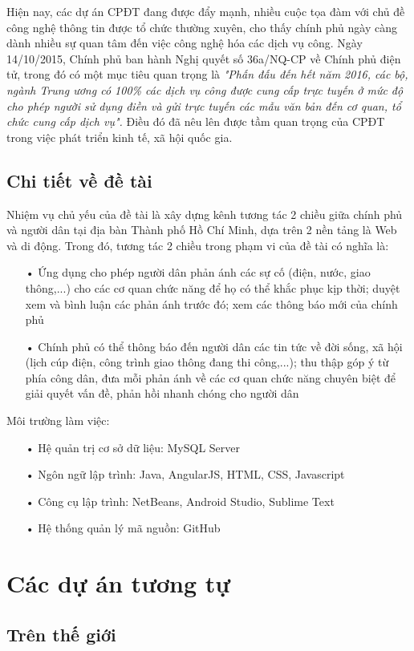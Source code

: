 \documentclass[a4paper]{article}
\begin{document}
Hiện nay, các dự án CPĐT đang được đẩy mạnh, nhiều cuộc tọa đàm với chủ đề công nghệ thông tin được tổ chức thường xuyên, cho thấy chính phủ ngày càng dành nhiều sự quan tâm đến việc công nghệ hóa các dịch vụ công. Ngày 14/10/2015, Chính phủ ban hành Nghị quyết số 36a/NQ-CP về Chính phủ điện tử, trong đó có một mục tiêu quan trọng là \textit{"Phấn đấu đến hết năm 2016, các bộ, ngành Trung ương có 100\% các dịch vụ công được cung cấp trực tuyến ở mức độ cho phép người sử dụng điền và gửi trực tuyến các mẫu văn bản đến cơ quan, tổ chức cung cấp dịch vụ".} Điều đó đã nêu lên được tầm quan trọng của CPĐT trong việc phát triển kinh tế, xã hội quốc gia. 
\subsection{Chi tiết về đề tài}
Nhiệm vụ chủ yếu của đề tài là xây dựng kênh tương tác 2 chiều giữa chính phủ và người dân tại địa bàn Thành phố Hồ Chí Minh, dựa trên 2 nền tảng là Web và di động. Trong đó, tương tác 2 chiều trong phạm vi của đề tài có nghĩa là:
\begin{itemize}
     \item[•]Ứng dụng cho phép người dân phản ánh các sự cố (điện, nước, giao thông,...) cho các cơ quan chức năng để họ có thể khắc phục kịp thời; duyệt xem và bình luận các phản ánh trước đó; xem các thông báo mới của chính phủ 
     \item[•]Chính phủ có thể thông báo đến người dân các tin tức về đời sống, xã hội (lịch cúp điện, công trình giao thông đang thi công,...); thu thập góp ý từ phía công dân, đưa mỗi phản ánh về các cơ quan chức năng chuyên biệt để giải quyết vấn đề, phản hồi nhanh chóng cho người dân
\end{itemize}
Môi trường làm việc:
\begin{itemize}
	\item[•]Hệ quản trị cơ sở dữ liệu: MySQL Server
	\item[•]Ngôn ngữ lập trình: Java, AngularJS, HTML, CSS, Javascript
	\item[•]Công cụ lập trình: NetBeans, Android Studio, Sublime Text
	\item[•]Hệ thống quản lý mã nguồn: GitHub
\end{itemize}
\section{Các dự án tương tự}
\subsection{Trên thế giới}
\end{document}
